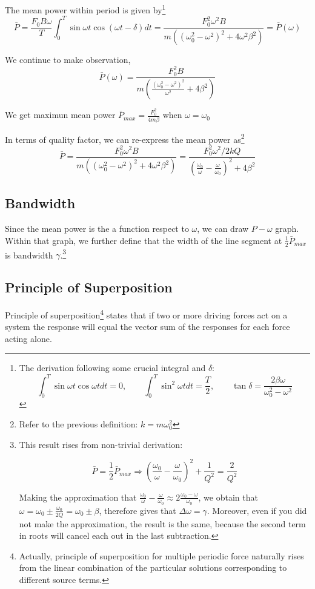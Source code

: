 \documentclass[UTF8]{book}
\begin{document}
The mean power within period is given by\footnote{The derivation following some crucial integral and $\delta $:
\[\int _{0}^{T}\sin \omega t\cos \omega tdt=0,\qquad \int _{0}^{T}\sin ^2\omega tdt=\frac{T}{2},\qquad \tan \delta =\frac{2\beta \omega }{\omega _0^2-\omega ^2}\]}
\[\bar{P}=\frac{F_0B\omega }{T}\int _{0}^{T}\sin \omega t\cos (\omega t-\delta )dt=\frac{F_0^2\omega ^2B}{m\left((\omega _0^2-\omega ^2)^2+4\omega ^2\beta ^2\right)}=\bar{P}(\omega )\]

We continue to make observation, 
\[\bar{P}(\omega )=\frac{F_0^2B}{m\left(\frac{(\omega _0^2-\omega ^2)^2}{\omega ^2}+4\beta ^2\right)}\]

We get maximun mean power $\bar{P}_{max}=\frac{F_0^2}{4m\beta }$ when $\omega =\omega _0$

In terms of quality factor, we can re-express the mean power as\footnote{Refer to the previous definition: $k=m\omega _0^2$}
\[\bar{P}=\frac{F_0^2\omega ^2B}{m\left((\omega _0^2-\omega ^2)^2+4\omega ^2\beta ^2\right)}=\frac{{F_0^2\omega ^2}/{2kQ}}{\left(\frac{\omega _0}{\omega }-\frac{\omega }{\omega _0}\right)^2+4\beta ^2}\]


\subsection{Bandwidth}
Since the mean power is the a function respect to $\omega $, we can draw $P-\omega $ graph. Within that graph, we further define that the width of the line segment at $\frac{1}{2}\bar{P}_{max}$ is bandwidth $\gamma $.\footnote{This result rises from non-trivial derivation:

\[\bar{P}=\frac{1}{2}\bar{P}_{max} \Rightarrow \left(\frac{\omega _0}{\omega }-\frac{\omega }{\omega _0}\right)^2+\frac{1}{Q^2}=\frac{2}{Q^2}\]

Making the approximation that $\frac{\omega _0}{\omega }-\frac{\omega }{\omega _0}\approx 2\frac{\omega _0-\omega}{\omega _0}$, we obtain that $\omega =\omega _0\pm \frac{\omega _0}{2Q}=\omega _0\pm \beta$, therefore gives that $\Delta \omega =\gamma$. Moreover, even if you did not make the approximation, the result is the same, because the second term in roots will cancel each out in the last subtraction. }


\subsection{Principle of Superposition}
Principle of superposition\footnote{Actually, principle of superposition for multiple periodic force naturally rises from the linear combination of the particular solutions corresponding to different source terms.} states that if two or more driving forces act on a system the response will equal the vector sum of the responses for each force acting alone.
\end{document}
